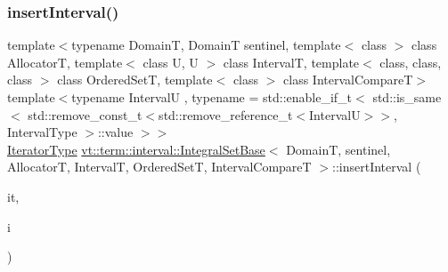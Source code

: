 \subsubsection{\texorpdfstring{insert\+Interval()}{insertInterval()}\hspace{0.1cm}{\footnotesize\ttfamily [2/2]}}
{\footnotesize\ttfamily template$<$typename DomainT, DomainT sentinel, template$<$ class $>$ class AllocatorT, template$<$ class U, U $>$ class IntervalT, template$<$ class, class, class $>$ class Ordered\+SetT, template$<$ class $>$ class Interval\+CompareT$>$ \\
template$<$typename IntervalU , typename  = std\+::enable\+\_\+if\+\_\+t$<$      std\+::is\+\_\+same$<$        std\+::remove\+\_\+const\+\_\+t$<$std\+::remove\+\_\+reference\+\_\+t$<$\+Interval\+U$>$$>$, Interval\+Type      $>$\+::value    $>$$>$ \\
\hyperlink{structvt_1_1term_1_1interval_1_1_integral_set_base_a111b2ec1ea960a40ba4270be702f11f1}{Iterator\+Type} \hyperlink{structvt_1_1term_1_1interval_1_1_integral_set_base}{vt\+::term\+::interval\+::\+Integral\+Set\+Base}$<$ DomainT, sentinel, AllocatorT, IntervalT, Ordered\+SetT, Interval\+CompareT $>$\+::insert\+Interval (\begin{DoxyParamCaption}\item[{\hyperlink{structvt_1_1term_1_1interval_1_1_integral_set_base_a111b2ec1ea960a40ba4270be702f11f1}{Iterator\+Type}}]{it,  }\item[{IntervalU \&\&}]{i }\end{DoxyParamCaption})\hspace{0.3cm}{\ttfamily [inline]}}

\mbox{\label{structvt_1_1term_1_1interval_1_1_integral_set_base_a87c94a2beab19ba74470b18a1de9aedf}} 
